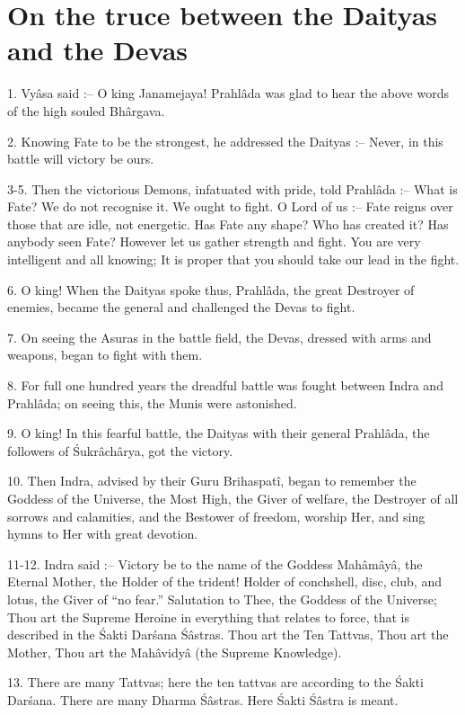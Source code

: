 ﻿\chapter{On the truce between the Daityas and the Devas}

1. Vy\^asa said :-- O king Janamejaya! Prahl\^ada was glad to hear the above words of the high souled Bh\^argava.

2. Knowing Fate to be the strongest, he addressed the Daityas :-- Never, in this battle will victory be ours.

3-5. Then the victorious Demons, infatuated with pride, told Prahl\^ada :-- What is Fate? We do not recognise it. We ought to fight. O Lord of us :-- Fate reigns over those that are idle, not energetic. Has Fate any shape? Who has created it? Has anybody seen Fate? However let us gather strength and fight. You are very intelligent and all knowing; It is proper that you should take our lead in the fight.

6. O king! When the Daityas spoke thus, Prahl\^ada, the great Destroyer of enemies, became the general and challenged the Devas to fight.

7. On seeing the Asuras in the battle field, the Devas, dressed with arms and weapons, began to fight with them.

8. For full one hundred years the dreadful battle was fought between Indra and Prahl\^ada; on seeing this, the Munis were astonished.

9. O king! In this fearful battle, the Daityas with their general Prahl\^ada, the followers of \'Sukr\^ach\^arya, got the victory.

10. Then Indra, advised by their Guru Brihaspat\^i, began to remember the Goddess of the Universe, the Most High, the Giver of welfare, the Destroyer of all sorrows and calamities, and the Bestower of freedom, worship Her, and sing hymns to Her with great devotion.

11-12. Indra said :-- Victory be to the name of the Goddess Mah\^am\^ay\^a, the Eternal Mother, the Holder of the trident! Holder of conchshell, disc, club, and lotus, the Giver of ``no fear.'' Salutation to Thee, the Goddess of the Universe; Thou art the Supreme Heroine in everything that relates to force, that is described in the \'Sakti Dar\'sana \'S\^astras. Thou art the Ten Tattvas, Thou art the Mother, Thou art the Mah\^avidy\^a (the Supreme Knowledge).

13. There are many Tattvas; here the ten tattvas are according to the \'Sakti Dar\'sana. There are many Dharma \'S\^astras. Here \'Sakti \'S\^astra is meant.

